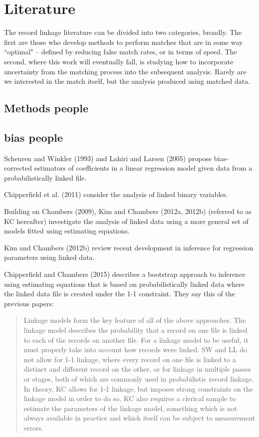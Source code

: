 \documentclass[11pt,reqno]{amsart}
\begin{document}
\section{Literature}

The record linkage literature can be divided into two categories, broadly.  The first are those who develop methods to perform matches that are in some way ``optimal" -- defined by reducing false match rates, or in terms of speed.  The second, where this work will eventually fall, is studying how to incorporate uncertainty from the matching process into the subsequent analysis.  Rarely are we interested in the match itself, but the analysis produced using matched data.  
\subsection{Methods people}
\subsection{bias people}
Scheuren and Winkler (1993) and Lahiri and Larsen (2005) propose bias-corrected estimators of coefficients in a linear regression model given data from a probabilistically linked file. 

Chipperfield et al. (2011) consider the analysis of linked binary variables.

Building on Chambers (2009), Kim and Chambers (2012a, 2012b) (referred to as KC hereafter) investigate the analysis of linked data using a more general set of models fitted using estimating equations.

Kim and Chambers (2012b) review recent development in inference for regression parameters
using linked data.

Chipperfield and Chambers (2015) describes a bootstrap approach to inference using estimating equations that is based on probabilistically linked data where the linked data file is created under the 1-1 constraint.  They say this of the previous papers: 

\begin{quote}
Linkage models form the key feature of all of the above approaches. The linkage model
describes the probability that a record on one file is linked to each of the records on another
file. For a linkage model to be useful, it must properly take into account how records were
linked. SW and LL do not allow for 1-1 linkage, where every record on one file is linked to
a distinct and different record on the other, or for linkage in multiple passes or stages,
both of which are commonly used in probabilistic record linkage. In theory, KC allows
for 1-1 linkage, but imposes strong constraints on the linkage model in order to do so.
KC also requires a clerical sample to estimate the parameters of the linkage model,
something which is not always available in practice and which itself can be subject to
measurement errors.
\end{quote}
\end{document}
